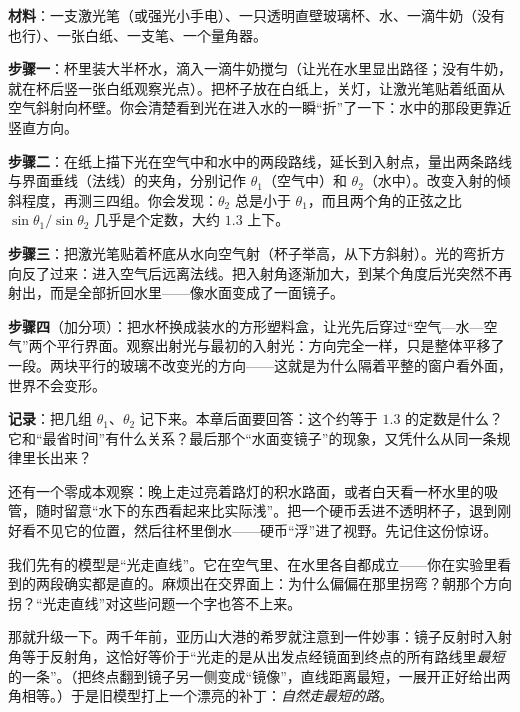 
\begin{experiment}
\textbf{材料}：一支激光笔（或强光小手电）、一只透明直壁玻璃杯、水、一滴牛奶（没有也行）、一张白纸、一支笔、一个量角器。

\textbf{步骤一}：杯里装大半杯水，滴入一滴牛奶搅匀（让光在水里显出路径；没有牛奶，就在杯后竖一张白纸观察光点）。把杯子放在白纸上，关灯，让激光笔贴着纸面从空气斜射向杯壁。你会清楚看到光在进入水的一瞬“折”了一下：水中的那段更靠近竖直方向。

\textbf{步骤二}：在纸上描下光在空气中和水中的两段路线，延长到入射点，量出两条路线与界面垂线（法线）的夹角，分别记作 \(\theta_1\)（空气中）和 \(\theta_2\)（水中）。改变入射的倾斜程度，再测三四组。你会发现：\(\theta_2\) 总是小于 \(\theta_1\)，而且两个角的正弦之比 \(\sin\theta_1/\sin\theta_2\) 几乎是个定数，大约 \(1.3\) 上下。

\textbf{步骤三}：把激光笔贴着杯底从水向空气射（杯子举高，从下方斜射）。光的弯折方向反了过来：进入空气后远离法线。把入射角逐渐加大，到某个角度后光突然不再射出，而是全部折回水里——像水面变成了一面镜子。

\textbf{步骤四}（加分项）：把水杯换成装水的方形塑料盒，让光先后穿过“空气—水—空气”两个平行界面。观察出射光与最初的入射光：方向完全一样，只是整体平移了一段。两块平行的玻璃不改变光的方向——这就是为什么隔着平整的窗户看外面，世界不会变形。

\textbf{记录}：把几组 \(\theta_1\)、\(\theta_2\) 记下来。本章后面要回答：这个约等于 \(1.3\) 的定数是什么？它和“最省时间”有什么关系？最后那个“水面变镜子”的现象，又凭什么从同一条规律里长出来？
\end{experiment}

还有一个零成本观察：晚上走过亮着路灯的积水路面，或者白天看一杯水里的吸管，随时留意“水下的东西看起来比实际浅”。把一个硬币丢进不透明杯子，退到刚好看不见它的位置，然后往杯里倒水——硬币“浮”进了视野。先记住这份惊讶。


我们先有的模型是“光走直线”。它在空气里、在水里各自都成立——你在实验里看到的两段确实都是直的。麻烦出在交界面上：为什么偏偏在那里拐弯？朝那个方向拐？“光走直线”对这些问题一个字也答不上来。

那就升级一下。两千年前，亚历山大港的希罗就注意到一件妙事：镜子反射时入射角等于反射角，这恰好等价于“光走的是从出发点经镜面到终点的所有路线里\emph{最短}的一条”。（把终点翻到镜子另一侧变成“镜像”，直线距离最短，一展开正好给出两角相等。）于是旧模型打上一个漂亮的补丁：\emph{自然走最短的路}。

